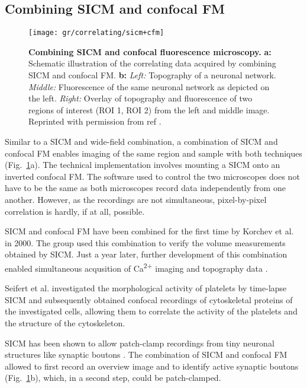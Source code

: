 \subsection{Combining SICM and confocal FM}

\begin{figure}
  \texttt{[image: gr/correlating/sicm+cfm]}
  \caption{%
    \textbf{Combining SICM and confocal fluorescence microscopy.}
    \textbf{a:} Schematic illustration of the correlating data acquired by combining SICM and confocal FM.
    \textbf{b:} 
    	\textit{Left:} Topography of a neuronal network.
    	\textit{Middle:} Fluorescence of the same neuronal network as depicted on the left.
    	\textit{Right:} Overlay of topography and fluorescence of two regions of interest (ROI 1, ROI 2) from
    	the left and middle image.
    Reprinted with permission from ref \cite{Novak2013}.
  }
  \label{fig:sicm+cfm}
\end{figure}

Similar to a SICM and wide-field combination, a combination of SICM and
confocal FM enables imaging of the same region and sample with both techniques
(Fig.~\ref{fig:sicm+cfm}a). The technical implementation involves mounting a
SICM onto an inverted confocal FM. The software used to control the two
microscopes does not have to be the same as both microscopes record data
independently from one another. However, as the recordings are not
simultaneous, pixel-by-pixel correlation is hardly, if at all, possible.

SICM and confocal FM have been combined for the first time by Korchev et al.
\cite{Korchev2000} in 2000. The group used this combination to verify the
volume measurements obtained by SICM. Just a year later, further development
of this combination enabled simultaneous acqusition of Ca\textsuperscript{2+}
imaging and topography data \cite{Shevchuk2001}.

Seifert et al. \cite{Seifert2017} investigated the morphological activity of
platelets by time-lapse SICM and subsequently obtained confocal recordings of
cytoskeletal proteins of the investigated cells, allowing them to correlate
the activity of the platelets and the structure of the cytoskeleton. 

SICM has been shown to allow patch-clamp recordings from tiny neuronal
structures like synaptic boutons \cite{Novak2013}. The combination of SICM and
confocal FM allowed to first record an overview image and to identify active
synaptic boutons (Fig.~\ref{fig:sicm+cfm}b), which, in a second step, could be
patch-clamped.


